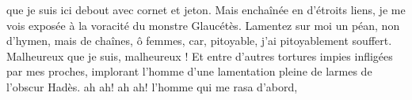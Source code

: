 \documentclass[12pt]{book}%
\newcommand{\espace}[1]{\hspace{#1}}%
\newcommand{\francais}[1]{{\policeFr #1}}%
\newlength{\larg}%
\newcommand{\decalageN}[1]{%
\settowidth{\larg}{#1}%
\espace{-\larg}%
}
\newcommand{\commentaire}[3]{\edtext{}{\Bfootnote[nonum,nosep]{\begin{adjustwidth}{-1.5cm}{-2cm}\espace{-1.5cm}\textbf{#1}\decalageN{\textbf{#1}}\espace{0pt}\espace{1.5cm}\textbf{#2} #3\end{adjustwidth}}}}%
\newcommand{\paratragiquesFr}[1]{%
\hangindent=30pt%
\espace{10pt}%
\francais{#1%
}}%
\newenvironment{groupe}{%
\pstart%
\ledgroup%
}{%
\pend %
}%
\begin{document}
\begin{pages}
\begin{Rightside}
\begin{groupe}
\paratragiquesFr{que je suis ici debout avec cornet et jeton.%
}
\end{groupe}%
\begin{groupe}%
\paratragiquesFr{Mais enchaînée en d'étroits liens,}
\end{groupe}%
\begin{groupe}%
\paratragiquesFr{je me vois exposée à la voracité du monstre Glaucétès.%
}
\end{groupe}%
\begin{groupe}%
\paratragiquesFr{Lamentez sur moi un péan, non d'hymen, mais de chaînes,}
\end{groupe}%
\begin{groupe}%
\paratragiquesFr{ô femmes, car,}
\end{groupe}%
\begin{groupe}%
\paratragiquesFr{pitoyable, j'ai pitoyablement souffert.}
\end{groupe}%
\begin{groupe}%
\paratragiquesFr{Malheureux que je suis, malheureux !}
\end{groupe}%
\begin{groupe}%
\paratragiquesFr{Et entre d'autres tortures impies infligées par mes proches,}
\end{groupe}%
\begin{groupe}%
\paratragiquesFr{implorant l'homme}
\end{groupe}%
\begin{groupe}%
\paratragiquesFr{d'une lamentation pleine de larmes de l'obscur Hadès.}
\end{groupe}%
\begin{groupe}%
\paratragiquesFr{ah ah! ah ah!}
\end{groupe}%
\begin{groupe}%
\paratragiquesFr{l'homme qui me rasa d'abord,}
\end{groupe}%
\begin{groupe}%

\end{groupe}
\end{Rightside}
\end{pages}
\end{document}
